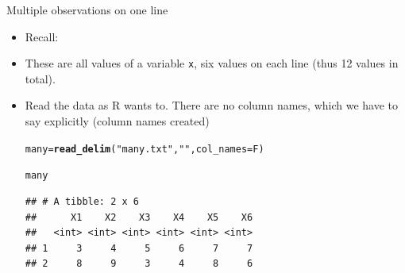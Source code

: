 \documentclass[unknownkeysallowed]{beamer}\usepackage[]{graphicx}\usepackage[]{color}
\makeatletter
\newcommand{\hlstr}[1]{\textcolor[rgb]{0.192,0.494,0.8}{#1}}%
\newcommand{\hlstd}[1]{\textcolor[rgb]{0.345,0.345,0.345}{#1}}%
\newcommand{\hlkwb}[1]{\textcolor[rgb]{0.69,0.353,0.396}{#1}}%
\newcommand{\hlkwc}[1]{\textcolor[rgb]{0.333,0.667,0.333}{#1}}%
\newcommand{\hlkwd}[1]{\textcolor[rgb]{0.737,0.353,0.396}{\textbf{#1}}}%
\newenvironment{kframe}{%
 \def\at@end@of@kframe{}%
 \ifinner\ifhmode%
  \def\at@end@of@kframe{\end{minipage}}%
  \begin{minipage}{\columnwidth}%
 \fi\fi%
 \def\FrameCommand##1{\hskip\@totalleftmargin \hskip-\fboxsep
 \colorbox{shadecolor}{##1}\hskip-\fboxsep
     \hskip-\linewidth \hskip-\@totalleftmargin \hskip\columnwidth}%
 \MakeFramed {\advance\hsize-\width
   \@totalleftmargin\z@ \linewidth\hsize
   \@setminipage}}%
 {\par\unskip\endMakeFramed%
 \at@end@of@kframe}
\newenvironment{knitrout}{}{} %
\makeatother
\begin{document}
\begin{frame}[fragile]{Multiple observations on one line}
  
  

\begin{itemize}
\item   Recall:



\item These are all values of a variable \texttt{x}, six values on
  each line (thus 12 values in total).
\item Read the data as R wants to. There are no column names, which we
  have to say explicitly (column names created)
  
\begin{knitrout}\small
{}\color{fgcolor}\begin{kframe}
\begin{alltt}
\hlstd{many}\hlkwb{=}\hlkwd{read_delim}\hlstd{(}\hlstr{"many.txt"}\hlstd{,}\hlstr{" "}\hlstd{,}\hlkwc{col_names}\hlstd{=F)}
\end{alltt}


{\ttfamily\noindent\itshape\color{messagecolor}{\#\# Parsed with column specification:\\\#\# cols(\\\#\#\ \  X1 = col\_integer(),\\\#\#\ \  X2 = col\_integer(),\\\#\#\ \  X3 = col\_integer(),\\\#\#\ \  X4 = col\_integer(),\\\#\#\ \  X5 = col\_integer(),\\\#\#\ \  X6 = col\_integer()\\\#\# )}}\begin{alltt}
\hlstd{many}
\end{alltt}
\begin{verbatim}
## # A tibble: 2 x 6
##      X1    X2    X3    X4    X5    X6
##   <int> <int> <int> <int> <int> <int>
## 1     3     4     5     6     7     7
## 2     8     9     3     4     8     6
\end{verbatim}
\end{kframe}
\end{knitrout}

\end{itemize}
  
\end{frame}
\end{document}
